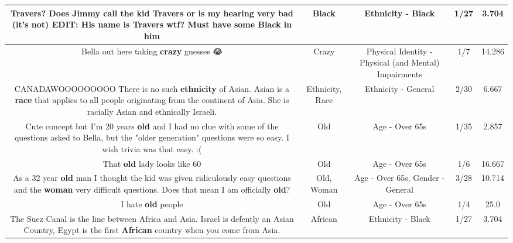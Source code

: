 \documentclass[11pt]{article}
\newlength\mylength
\begin{document}
\begin{center}
\begin{longtable}{|C{.65\mylength}|C{.30\mylength}|C{.12\mylength}|C{.12\mylength}|C{.12\mylength}|}
  \small Travers? Does Jimmy call the kid Travers or is my hearing very bad (it's not) EDIT: His name is Travers wtf? Must have some \textbf{Black} in him\normalsize   & Black & Ethnicity - Black & 1/27 & 3.704 \\  \hline
  \small Bella out here taking \textbf{crazy} guesses 😂\normalsize   & Crazy & Physical Identity - Physical (and Mental) Impairments & 1/7 & 14.286 \\  \hline
  \small CANADAWOOOOOOOOO There is no such \textbf{ethnicity} of Asian. Asian is a \textbf{race} that applies to all people originating from the continent of Asia. She is racially Asian and ethnically Israeli.\normalsize   & Ethnicity, Race & Ethnicity - General & 2/30 & 6.667 \\  \hline
  \small Cute concept but I'm 20 years \textbf{old} and I had no clue with some of the questions asked to Bella, but the "older generation" questions were so easy. I wish trivia was that easy. :(\normalsize   & Old & Age - Over 65s & 1/35 & 2.857 \\  \hline
  \small That \textbf{old} lady looks like 60\normalsize   & Old & Age - Over 65s & 1/6 & 16.667 \\  \hline
  \small As a 32 year \textbf{old} man I thought the kid was given ridiculously easy questions and the \textbf{woman} very difficult questions. Does that mean I am officially \textbf{old}?\normalsize   & Old, Woman & Age - Over 65s, Gender - General & 3/28 & 10.714 \\  \hline
  \small I hate \textbf{old} people\normalsize   & Old & Age - Over 65s & 1/4 & 25.0 \\  \hline
  \small The Suez Canal is the line between Africa and Asia. Israel is defently an Asian Country, Egypt is the first \textbf{African} country when you come from Asia.\normalsize   & African & Ethnicity - Black & 1/27 & 3.704 \\  \hline

\end{longtable}
\end{center}
\end{document}

